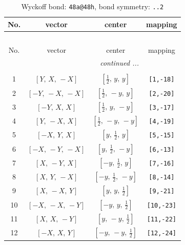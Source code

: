 \documentclass[fleqn,8pt]{jsarticle}
\begin{document}
\begin{longtable}{cccc}
\caption{Wyckoff bond: {\tt 48a@48h}, bond symmetry: {\tt ..2}}
 \\
 \hline \hline
No. & vector & center & mapping \\ \hline \endfirsthead

\multicolumn{3}{l}{\tablename\ \thetable{}} \\
 \hline \hline
No. & vector & center & mapping \\ \hline \endhead

 \hline \hline
\multicolumn{3}{r}{\footnotesize\it continued ...} \\ \endfoot

 \hline \hline
\multicolumn{3}{r}{} \\ \endlastfoot

1 & $\left[ Y,\, X,\, - X \right]$ & $\left[ \frac{1}{2},\, y,\, y \right]$ & {\tt [1,-18]} \\ \hline
2 & $\left[ - Y,\, - X,\, - X \right]$ & $\left[ \frac{1}{2},\, - y,\, y \right]$ & {\tt [2,-20]} \\ \hline
3 & $\left[ - Y,\, X,\, X \right]$ & $\left[ \frac{1}{2},\, y,\, - y \right]$ & {\tt [3,-17]} \\ \hline
4 & $\left[ Y,\, - X,\, X \right]$ & $\left[ \frac{1}{2},\, - y,\, - y \right]$ & {\tt [4,-19]} \\ \hline
5 & $\left[ - X,\, Y,\, X \right]$ & $\left[ y,\, \frac{1}{2},\, y \right]$ & {\tt [5,-15]} \\ \hline
6 & $\left[ - X,\, - Y,\, - X \right]$ & $\left[ y,\, \frac{1}{2},\, - y \right]$ & {\tt [6,-13]} \\ \hline
7 & $\left[ X,\, - Y,\, X \right]$ & $\left[ - y,\, \frac{1}{2},\, y \right]$ & {\tt [7,-16]} \\ \hline
8 & $\left[ X,\, Y,\, - X \right]$ & $\left[ - y,\, \frac{1}{2},\, - y \right]$ & {\tt [8,-14]} \\ \hline
9 & $\left[ X,\, - X,\, Y \right]$ & $\left[ y,\, y,\, \frac{1}{2} \right]$ & {\tt [9,-21]} \\ \hline
10 & $\left[ - X,\, - X,\, - Y \right]$ & $\left[ - y,\, y,\, \frac{1}{2} \right]$ & {\tt [10,-23]} \\ \hline
11 & $\left[ X,\, X,\, - Y \right]$ & $\left[ y,\, - y,\, \frac{1}{2} \right]$ & {\tt [11,-22]} \\ \hline
12 & $\left[ - X,\, X,\, Y \right]$ & $\left[ - y,\, - y,\, \frac{1}{2} \right]$ & {\tt [12,-24]} \\
\end{longtable}
\end{document}
